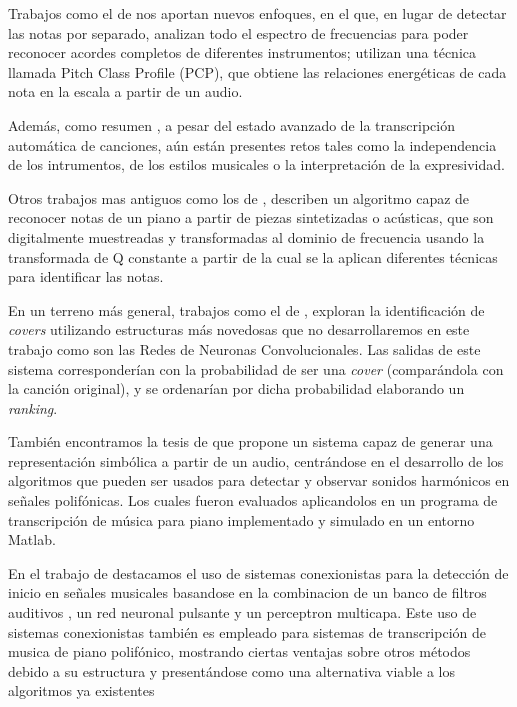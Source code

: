 \documentclass[12pt]{article}
\begin{document}
\bigskip
Trabajos como el de \cite{osmalsky2012neural} nos aportan nuevos enfoques, 
en el que, en lugar de detectar las notas por separado, analizan todo el espectro de frecuencias para poder reconocer acordes completos de diferentes instrumentos;
utilizan una técnica llamada Pitch Class Profile (PCP), que obtiene las relaciones energéticas de cada nota en la escala a partir de un audio.

\bigskip
Además, como resumen \cite{benetos2018automatic},
a pesar del estado avanzado de la transcripción automática de canciones, aún están presentes retos tales como la independencia de los intrumentos, de los estilos
musicales o la interpretación de la expresividad.

\bigskip
Otros trabajos mas antiguos como los de \cite{foo1999recognition}, describen un algoritmo capaz de reconocer notas
de un piano a partir de piezas sintetizadas o acústicas, que son digitalmente muestreadas y transformadas al dominio de frecuencia usando 
la transformada de Q constante a partir de la cual se la aplican diferentes técnicas para identificar las notas.

\bigskip
En un terreno más general, trabajos como el de \cite{chang2017audio}, exploran la identificación de \textit{covers} utilizando
estructuras más novedosas que no desarrollaremos en este trabajo como son las Redes de Neuronas Convolucionales. Las salidas de este
sistema corresponderían con la probabilidad de ser una \textit{cover} (comparándola con la canción original), y se ordenarían por dicha 
probabilidad elaborando un \textit{ranking}.

\bigskip
También encontramos la tesis de \cite{klapuri2004signal} que propone un sistema capaz de generar una representación 
simbólica a partir de un audio, centrándose en el desarrollo de los algoritmos que pueden ser usados para detectar y observar sonidos harmónicos en señales polifónicas.
Los cuales fueron evaluados aplicandolos en un programa de transcripción de música para piano implementado y simulado en un entorno Matlab.

\bigskip
En el trabajo de \cite{marolt2002neural} destacamos el uso de sistemas conexionistas para la detección de inicio en señales musicales basandose en la combinacion de un banco de filtros auditivos
, un red neuronal pulsante y un perceptron multicapa. Este uso de sistemas conexionistas también es empleado para sistemas de transcripción de musica de piano polifónico, mostrando ciertas ventajas sobre otros métodos debido a su estructura y 
presentándose como una alternativa viable a los algoritmos ya existentes
\end{document}
